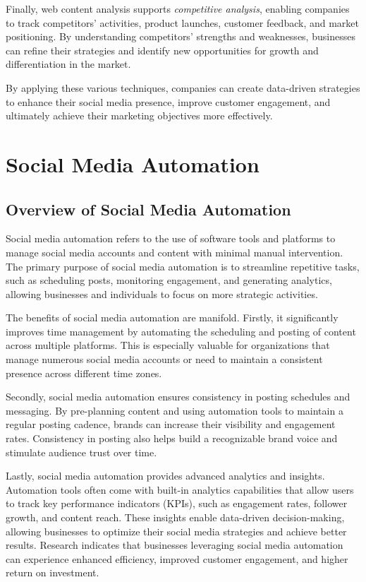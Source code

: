 Finally, web content analysis supports \textit{competitive analysis}, enabling companies to track competitors' activities, product launches, customer feedback, and market positioning.
By understanding competitors' strengths and weaknesses, businesses can refine their strategies and identify new opportunities for growth and differentiation in the market.

By applying these various techniques, companies can create data-driven strategies to enhance their social media presence, improve customer engagement, and ultimately achieve their marketing objectives more effectively.

\section{Social Media Automation}
\label{sec:social_media_automation}

\subsection{Overview of Social Media Automation}
\label{subsec:overview_of_social_media_automation}
Social media automation refers to the use of software tools and platforms to manage social media accounts and content with minimal manual intervention.
The primary purpose of social media automation is to streamline repetitive tasks, such as scheduling posts, monitoring engagement, and generating analytics, allowing businesses and individuals to focus on more strategic activities.

The benefits of social media automation are manifold.
Firstly, it significantly improves time management by automating the scheduling and posting of content across multiple platforms.
This is especially valuable for organizations that manage numerous social media accounts or need to maintain a consistent presence across different time zones.

Secondly, social media automation ensures consistency in posting schedules and messaging.
By pre-planning content and using automation tools to maintain a regular posting cadence, brands can increase their visibility and engagement rates.
Consistency in posting also helps build a recognizable brand voice and stimulate audience trust over time.

Lastly, social media automation provides advanced analytics and insights.
Automation tools often come with built-in analytics capabilities that allow users to track key performance indicators (KPIs), such as engagement rates, follower growth, and content reach.
These insights enable data-driven decision-making, allowing businesses to optimize their social media strategies and achieve better results.
Research indicates that businesses leveraging social media automation can experience enhanced efficiency, improved customer engagement, and higher return on investment\cite{can_you_measure_the_roi_of_your_social_media_marketing}.

